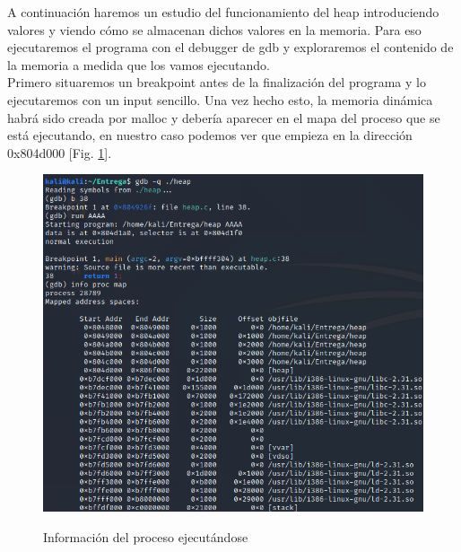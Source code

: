 \documentclass[10pt,a4paper]{article}
\begin{document}
A continuación haremos un estudio del funcionamiento del heap introduciendo valores y viendo cómo se almacenan dichos valores en la memoria. Para eso ejecutaremos el programa con el debugger de gdb y exploraremos el contenido de la memoria a medida que los vamos ejecutando.\\

Primero situaremos un breakpoint antes de la finalización del programa y lo ejecutaremos con un input sencillo.  Una vez hecho esto, la memoria dinámica habrá sido creada por malloc y debería aparecer en el mapa del proceso que se está ejecutando, en nuestro caso podemos ver que empieza en la dirección 0x804d000 [Fig. \ref{fig:figura1}].

\begin{figure}[h!]
  \centering
  \includegraphics[scale=0.6]{1.png}\\
  \caption{Información del proceso ejecutándose}
  \label{fig:figura1}
\end{figure}

\pagebreak
\end{document}
